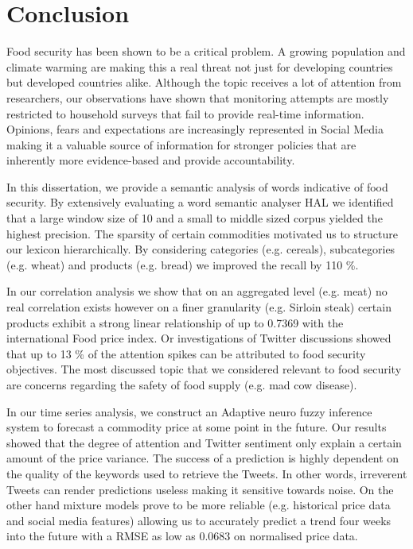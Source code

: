 \chapter{Conclusion}
\label{6}



Food security has been shown to be a critical problem. A growing population and climate warming are making this a real threat not just for developing countries but developed countries alike. Although the topic receives a lot of attention from researchers, our observations have shown that monitoring attempts are mostly restricted to household surveys that fail to provide real-time information. Opinions, fears and expectations are increasingly represented in Social Media making it a valuable source of information for stronger policies that are inherently more evidence-based and provide accountability.

In this dissertation, we provide a semantic analysis of words indicative of food security. By extensively evaluating a word semantic analyser HAL we identified that a large window size of 10  and a small to middle sized corpus yielded the highest precision. The sparsity of certain commodities motivated us to structure our lexicon hierarchically. By considering categories (e.g. cereals), subcategories (e.g. wheat) and products (e.g. bread) we improved the recall by 110 \%. 

In our correlation analysis we show that on an aggregated level (e.g. meat)  no real correlation exists however on a finer granularity (e.g. Sirloin steak) certain products exhibit a strong linear relationship of up to 0.7369 with the international Food price index.  Or investigations of Twitter discussions showed that up to 13 \% of the attention spikes can be attributed to food security objectives. The most discussed topic that we considered relevant to food security are concerns regarding the safety of food supply (e.g. mad cow disease). 

In our time series analysis, we construct an Adaptive neuro fuzzy inference system to forecast a commodity price at some point in the future. Our results showed that the degree of attention and Twitter sentiment only explain a certain amount of the price variance. The success of a prediction is highly dependent on the quality of the keywords used to retrieve the Tweets. In other words, irreverent Tweets can render predictions useless making it  sensitive towards noise. On the other hand mixture models prove to be more reliable (e.g. historical price data and social media features) allowing us to accurately predict a trend four weeks into the future with a RMSE as low as 0.0683 on normalised price data.

